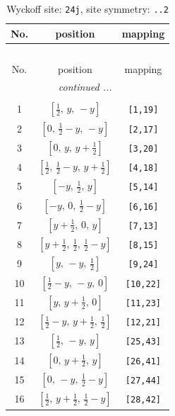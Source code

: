\documentclass[fleqn,8pt]{jsarticle}
\begin{document}
\begin{longtable}{ccc}
\caption{Wyckoff site: {\tt 24j}, site symmetry: {\tt ..2}}
 \\
 \hline \hline
No. & position & mapping \\ \hline \endfirsthead

\multicolumn{2}{l}{\tablename\ \thetable{}} \\
 \hline \hline
No. & position & mapping \\ \hline \endhead

 \hline \hline
\multicolumn{2}{r}{\footnotesize\it continued ...} \\ \endfoot

 \hline \hline
\multicolumn{2}{r}{} \\ \endlastfoot

1 & $\left[ \frac{1}{2},\, y,\, - y \right]$ & {\tt [1,19]} \\ \hline
2 & $\left[ 0,\, \frac{1}{2} - y,\, - y \right]$ & {\tt [2,17]} \\ \hline
3 & $\left[ 0,\, y,\, y + \frac{1}{2} \right]$ & {\tt [3,20]} \\ \hline
4 & $\left[ \frac{1}{2},\, \frac{1}{2} - y,\, y + \frac{1}{2} \right]$ & {\tt [4,18]} \\ \hline
5 & $\left[ - y,\, \frac{1}{2},\, y \right]$ & {\tt [5,14]} \\ \hline
6 & $\left[ - y,\, 0,\, \frac{1}{2} - y \right]$ & {\tt [6,16]} \\ \hline
7 & $\left[ y + \frac{1}{2},\, 0,\, y \right]$ & {\tt [7,13]} \\ \hline
8 & $\left[ y + \frac{1}{2},\, \frac{1}{2},\, \frac{1}{2} - y \right]$ & {\tt [8,15]} \\ \hline
9 & $\left[ y,\, - y,\, \frac{1}{2} \right]$ & {\tt [9,24]} \\ \hline
10 & $\left[ \frac{1}{2} - y,\, - y,\, 0 \right]$ & {\tt [10,22]} \\ \hline
11 & $\left[ y,\, y + \frac{1}{2},\, 0 \right]$ & {\tt [11,23]} \\ \hline
12 & $\left[ \frac{1}{2} - y,\, y + \frac{1}{2},\, \frac{1}{2} \right]$ & {\tt [12,21]} \\ \hline
13 & $\left[ \frac{1}{2},\, - y,\, y \right]$ & {\tt [25,43]} \\ \hline
14 & $\left[ 0,\, y + \frac{1}{2},\, y \right]$ & {\tt [26,41]} \\ \hline
15 & $\left[ 0,\, - y,\, \frac{1}{2} - y \right]$ & {\tt [27,44]} \\ \hline
16 & $\left[ \frac{1}{2},\, y + \frac{1}{2},\, \frac{1}{2} - y \right]$ & {\tt [28,42]} \\ \hline

\end{longtable}
\end{document}
